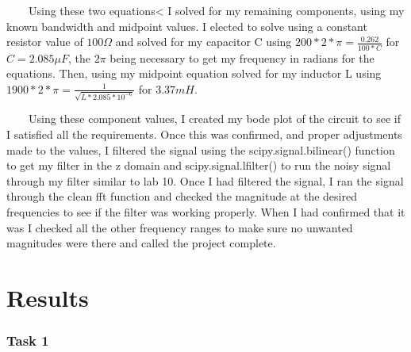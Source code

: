 \documentclass[11pt,a4]{article}
\begin{document}
\ \ \ \ Using these two equations< I solved for my remaining components, using my known bandwidth and midpoint values. I elected to solve using a constant resistor value of $100 \Omega$ and solved for my capacitor C using $200*2*\pi = \frac{0.262}{100*C}$ for $C = 2.085 \mu F$, the $2\pi$ being necessary to get my frequency in radians for the equations. Then, using my midpoint equation solved for my inductor L using $1900*2*\pi = \frac{1}{\sqrt{L*2.085*10^{-6}}}$ for $3.37 mH$.

\ \ \ \ Using these component values, I created my bode plot of the circuit to see if I satisfied all the requirements. Once this was confirmed, and proper adjustments made to the values, I filtered the signal using the scipy.signal.bilinear() function to get my filter in the z domain and scipy.signal.lfilter() to run the noisy signal through my filter similar to lab 10. Once I had filtered the signal, I ran the signal through the clean fft function and checked the magnitude at the desired frequencies to see if the filter was working properly. When I had confirmed that it was I checked all the other frequency ranges to make sure no unwanted magnitudes were there and called the project complete.


\section{Results}

\subsubsection{Task 1}
\end{document}
